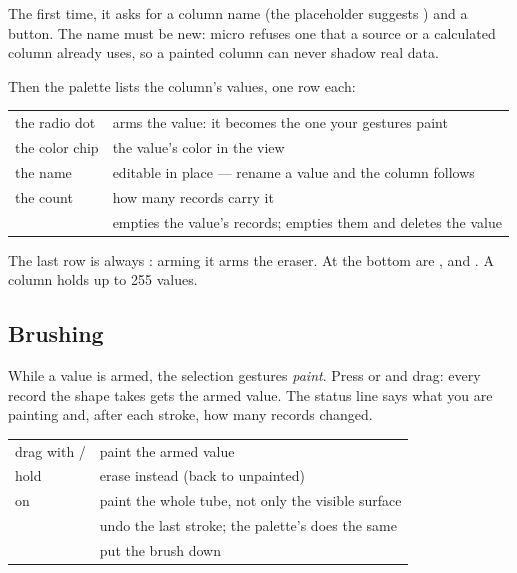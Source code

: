 The first time, it asks for a column name (the placeholder suggests ) and a  button. The name must be new: micro refuses one that a source or a calculated column already uses, so a painted column can never shadow real data.

Then the palette lists the column's values, one row each:

\begin{center}
\begin{tabularx}{\linewidth}{@{}lL@{}}\toprule
the radio dot & arms the value: it becomes the one your gestures paint \\
the color chip & the value's color in the view \\
the name & editable in place — rename a value and the column follows \\
the count & how many records carry it \\
 &  empties the value's records;  empties them and deletes the value \\ \bottomrule
\end{tabularx}
\end{center}

The last row is always : arming it arms the eraser. At the bottom are ,  and . A column holds up to 255 values.


\subsection{Brushing}
While a value is armed, the selection gestures \emph{paint}. Press  or  and drag: every record the shape takes gets the armed value. The status line says what you are painting and, after each stroke, how many records changed.

\begin{center}
\begin{tabularx}{\linewidth}{@{}lL@{}}\toprule
drag with  /  & paint the armed value \\
hold  & erase instead (back to unpainted) \\
 on & paint the whole tube, not only the visible surface \\
 & undo the last stroke; the palette's  does the same \\
 & put the brush down \\ \bottomrule
\end{tabularx}
\end{center}

